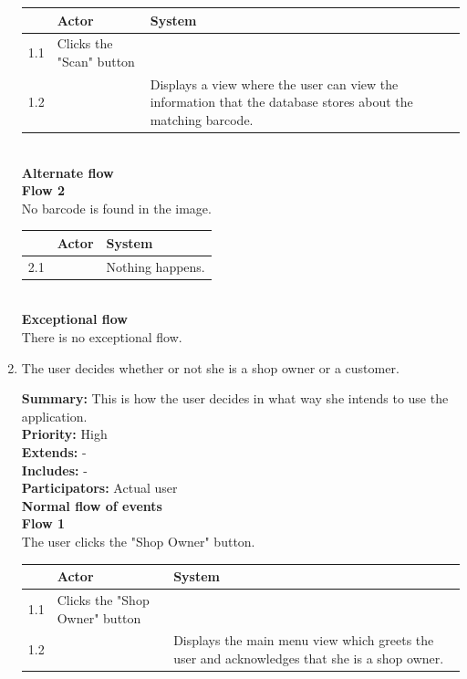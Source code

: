 \documentclass{report}
\begin{document}
\begin{enumerate}
    \begin{tabular}{ | p{1cm} | p{3cm} | p{4cm} |}
    \hline
      & Actor & System \\ \hline
    1.1 & Clicks the "Scan" button & \\ \hline
    1.2 & & Displays a view where the user can view the information that the database stores about the matching barcode. \\
    \hline
    \end{tabular} \\

    \textbf{Alternate flow} \\
    \textbf{Flow 2} \\ No barcode is found in the image. \\

    \begin{tabular}{ | p{1cm} | p{3cm} | p{4cm} |}
    \hline
      & Actor & System \\ \hline
    2.1 & & Nothing happens. \\
    \hline
    \end{tabular} \\

    \textbf{Exceptional flow} \\ There is no exceptional flow.

  \item The user decides whether or not she is a shop owner or a customer. \

    \textbf{Summary:} This is how the user decides in what way she intends to use the application. \\
    \textbf{Priority:} High \\
    \textbf{Extends:} - \\
    \textbf{Includes:} - \\
    \textbf{Participators:} Actual user \\
    \textbf{Normal flow of events} \\
    \textbf{Flow 1} \\ The user clicks the "Shop Owner" button. \\

    \begin{tabular}{ | p{1cm} | p{3cm} | p{4cm} |}
    \hline
      & Actor & System \\ \hline
    1.1 & Clicks the "Shop Owner" button & \\ \hline
    1.2 & & Displays the main menu view which greets the user and acknowledges that she is a shop owner. \\
    \hline
    \end{tabular} \\


\end{enumerate}
\end{document}
